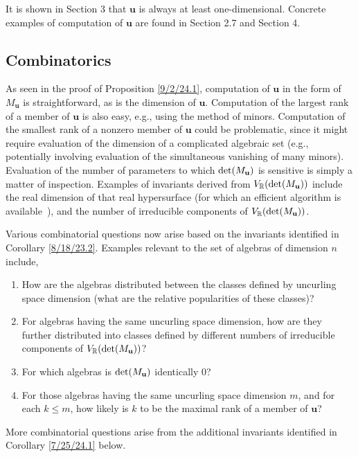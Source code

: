 \documentclass{amsart}
\numberwithin{equation}{section}
\theoremstyle{definition}
\numberwithin{theorem}{section}
\begin{document}
   It is shown in Section 3 that $\mathbf{u}$ is always at least one-dimensional.   Concrete examples of computation of $\mathbf{u}$ are found in Section 2.7 and Section 4.  
  
\subsection{Combinatorics} As seen in the proof of Proposition \ref{9/2/24.1}, computation of $\mathbf{u}$ in the form of $M_\mathbf{u}$ is straightforward, as is the dimension of $\mathbf{u}$.   Computation of the largest rank of a member of $\mathbf{u}$ is also easy, e.g., using the method of minors.  Computation of the smallest rank of a nonzero member of $\mathbf{u}$ could be problematic, since it might require evaluation of the dimension of a complicated algebraic set (e.g., potentially involving evaluation of the simultaneous vanishing of many minors).  Evaluation of the number of parameters to which ${\rm det}(M_{\mathbf{u}})$ is sensitive is simply a matter of inspection.  Examples of invariants derived from $V_\mathbb{R}({\rm det}(M_{\mathbf{u}}))$ include the real dimension of that real hypersurface (for which an efficient algorithm is \mbox{available \cite{bannwarth:2015})}, and the number of irreducible components of $V_\mathbb{R}({\rm det}(M_{\mathbf{u}}))$.  
 
Various combinatorial questions now arise based on the invariants identified in Corollary \ref{8/18/23.2}.  Examples relevant to the set of algebras of dimension $n$ include, \begin{enumerate} \item How are the algebras distributed between the classes defined by uncurling space dimension (what are the relative popularities of these classes)?  \item For algebras having the same uncurling space dimension, how are they further distributed into classes defined by different numbers of irreducible components of $V_\mathbb{R}({\rm det}(M_{\mathbf{u}}))$?  \item For which algebras is ${\rm det}(M_{\mathbf{u}})$ identically $0$?   \item For those algebras having the same uncurling space dimension $m$, and for each $k\le m$, how likely is $k$ to be the maximal rank of a member of $\mathbf{u}$?   \end{enumerate}  
More combinatorial questions arise from the additional invariants identified in Corollary \ref{7/25/24.1} below. 
\end{document}
